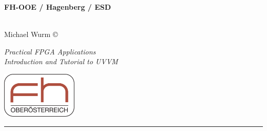 


\author{Michael Wurm}



\newcommand{\UebungNr}{UVVM Tutorial}
\newcommand{\UebungTopic}{A brief introduction to UVVM, with a\\
	tutorial on how to use it in an example testbench.}

\clearpage

\newpage
\thispagestyle{empty}
\tableofcontents
\newpage
\setcounter{page}{1}  %

\thispagestyle{empty}
\begin{minipage}[b][2.4cm]{0.7\textwidth}
	\noindent
	\raggedright
	\begin{large}\textbf{%
			FH-OOE / Hagenberg / ESD\\
			\ \\
		}\end{large}
	Michael Wurm \copyright\,\the\year\\
	\begin{large}
		\textit{Practical FPGA Applications}\\
		\vspace{0.0em} \textit{Introduction and Tutorial to UVVM }%
	\end{large}
\end{minipage}
\hfill
\includegraphics[height=2.2cm]{./img/FhOOeLogoFeb2005}
\noindent \rule[0.8em]{\textwidth}{0.12mm}

\lfoot{}
\cfoot{-\thepage-}
\rfoot{}
\noindent




